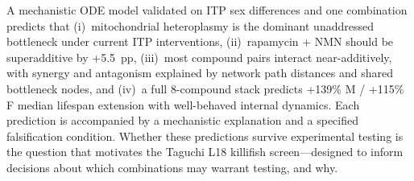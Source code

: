 \documentclass[11pt]{article}
\begin{document}
A mechanistic ODE model validated on ITP sex differences and one combination predicts that (i)~mitochondrial heteroplasmy is the dominant unaddressed bottleneck under current ITP interventions, (ii)~rapamycin + NMN should be superadditive by +5.5~pp, (iii)~most compound pairs interact near-additively, with synergy and antagonism explained by network path distances and shared bottleneck nodes, and (iv)~a full 8-compound stack predicts +139\% M / +115\% F median lifespan extension with well-behaved internal dynamics. Each prediction is accompanied by a mechanistic explanation and a specified falsification condition. Whether these predictions survive experimental testing is the question that motivates the Taguchi L18 killifish screen---designed to inform decisions about which combinations may warrant testing, and why.




\end{document}
